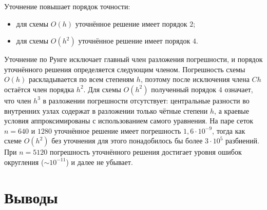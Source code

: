 \documentclass[12pt,a4paper]{article}
\begin{document}
Уточнение повышает порядок точности:
\begin{itemize}
\item для схемы $O(h)$ уточнённое решение имеет порядок $2$;
\item для схемы $O(h^2)$ уточнённое решение имеет порядок $4$.
\end{itemize}
Уточнение по Рунге исключает главный член разложения погрешности, и
порядок уточнённого решения определяется следующим членом. Погрешность
схемы $O(h)$ раскладывается по всем степеням $h$, поэтому после
исключения члена $Ch$ остаётся член порядка $h^2$. Для схемы $O(h^2)$
полученный порядок $4$ означает, что член $h^3$ в разложении
погрешности отсутствует: центральные разности во внутренних узлах
содержат в разложении только чётные степени $h$, а краевые условия
аппроксимированы с использованием самого уравнения. На паре сеток $n=640$ и $1280$
уточнённое решение имеет погрешность $1{,}6\cdot10^{-9}$, тогда как
схеме $O(h^2)$ без уточнения для этого понадобилось бы более
$3\cdot10^5$ разбиений. При $n = 5120$ погрешность уточнённого решения
достигает уровня ошибок округления ($\sim10^{-11}$) и далее не убывает.

\section{Выводы}
\end{document}
